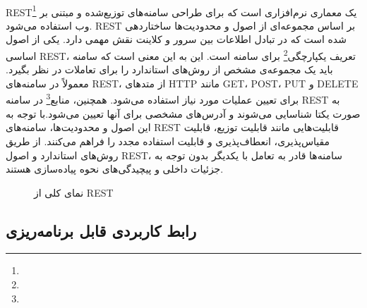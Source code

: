 \paragraph{}
{
    REST\footnote{} یک معماری نرم‌افزاری است که برای طراحی سامنه‌های توزیع‌شده و مبتنی بر وب استفاده می‌شود. REST بر اساس مجموعه‌ای از اصول و محدودیت‌ها ساختاردهی شده است که در تبادل اطلاعات بین سرور و کلاینت نقش مهمی دارد. یکی از اصول اساسی REST، تعریف یکپارچگی\footnote{} برای سامنه است. این به این معنی است که سامنه باید یک مجموعه‌ی مشخص از روش‌های استاندارد را برای تعاملات در نظر بگیرد. معمولاً در سامنه‌های REST، از متدهای HTTP مانند GET، POST، PUT و DELETE برای تعیین عملیات مورد نیاز استفاده می‌شود. همچنین، منابع\footnote{} در سامنه REST به صورت یکتا شناسایی می‌شوند و آدرس‌های مشخصی برای آنها تعیین می‌شود.با توجه به این اصول و محدودیت‌ها، سامنه‌های REST قابلیت‌هایی مانند قابلیت توزیع، قابلیت مقیاس‌پذیری، انعطاف‌پذیری و قابلیت استفاده مجدد را فراهم می‌کنند. از طریق روش‌های استاندارد و اصول REST، سامنه‌ها قادر به تعامل با یکدیگر بدون توجه به جزئیات داخلی و پیچیدگی‌های نحوه پیاده‌سازی هستند.   
    \begin{figure}[H]
        \caption{نمای کلی از REST}
        \label{fig:rest}
    \end{figure}
}

\subsection{رابط کاربردی قابل برنامه‌ریزی}
\label{subsecsec:api}
